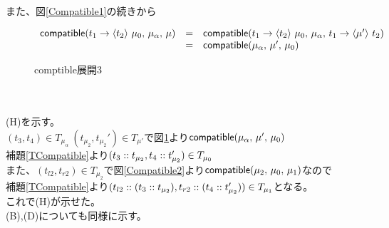 \\
また、図\ref{Compatible1}の続きから\\
\begin{figure}[h]
\[
\begin{array}{lcl}
  \Compatible{\Trail{t_1}{\mu_0}{t_2}}{\mu_{\alpha}}{\mu} &=& \Compatible{\Trail{t_1}{\mu_0}{t_2}}{\mu_{\alpha}}{\Trail{t_1}{t_2}{\mu'}}\\
  &=& \Compatible{\mu_{\alpha}}{\mu'}{\mu_0}
\end{array}
\]
\caption{\textsf{comptible}展開3}
\label{Compatible3}
\end{figure}\\
\\
(H)を示す。\\
$(t_3,t_4)\in T_{\mu_{\alpha}}\ (t_{\mu_2},t_{\mu_2}')\in T_{\mu'}$で図\ref{Compatible3}より$\Compatible{\mu_{\alpha}}{\mu'}{\mu_0}$\\
補題\ref{TCompatible}より$(\Cons{t_3}{t_{\mu_2}},\Cons{t_4}{t_{\mu_2}'})\in T_{\mu_0}$\\
また、$(t_{l2},t_{r2})\in T_{\mu_2}$で図\ref{Compatible2}より$\Compatible{\mu_2}{\mu_0}{\mu_1}$なので\\
補題\ref{TCompatible}より$(\Cons{t_{l2}}{\ConsP{t_3}{t_{\mu_2}}},\Cons{t_{r2}}{\ConsP{t_4}{t_{\mu_2}'}})\in T_{\mu_1}$となる。\\
これで(H)が示せた。\\
(B),(D)についても同様に示す。\\
